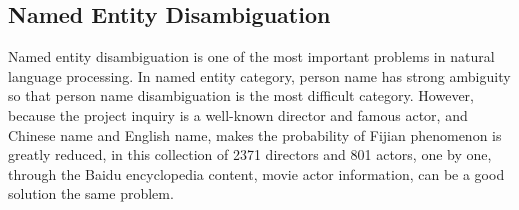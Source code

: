 \subsection{Named Entity Disambiguation}
Named entity disambiguation is one of the most important problems in natural language processing. In named entity category, person name has strong ambiguity so that person name disambiguation is the most difficult category. However, because the project inquiry is a well-known director and famous actor, and Chinese name and English name, makes the probability of Fijian phenomenon is greatly reduced, in this collection of 2371 directors and 801 actors, one by one, through the Baidu encyclopedia content, movie actor information, can be a good solution the same problem.